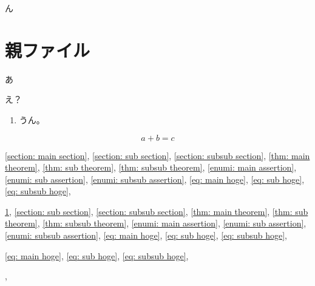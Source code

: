 \documentclass[uplatex,dvipdfmx]{jsarticle}
\begin{document}
ん

\section{親ファイル}\label{section: main section}
あ
\begin{thm}\label{thm: main theorem}
  え？
  \begin{enumerate}
    \item \label{enumi: main assertion}
    うん。
  \end{enumerate}
\end{thm}

\begin{equation}\label{eq: main hoge}
  a + b = c
  \tag{\(\dagger\)}
\end{equation}

\autoref{section: main section},
\autoref{section: sub section},
\autoref{section: subsub section},
\autoref{thm: main theorem},
\autoref{thm: sub theorem},
\autoref{thm: subsub theorem},
\autoref{enumi: main assertion},
\autoref{enumi: sub assertion},
\autoref{enumi: subsub assertion},
\autoref{eq: main hoge},
\autoref{eq: sub hoge},
\autoref{eq: subsub hoge},

\ref{section: main section},
\ref{section: sub section},
\ref{section: subsub section},
\ref{thm: main theorem},
\ref{thm: sub theorem},
\ref{thm: subsub theorem},
\ref{enumi: main assertion},
\ref{enumi: sub assertion},
\ref{enumi: subsub assertion},
\ref{eq: main hoge},
\ref{eq: sub hoge},
\ref{eq: subsub hoge},

\eqref{eq: main hoge},
\eqref{eq: sub hoge},
\eqref{eq: subsub hoge},

\cite{kashiwara2002sheaves},



\printbibliography
\end{document}
